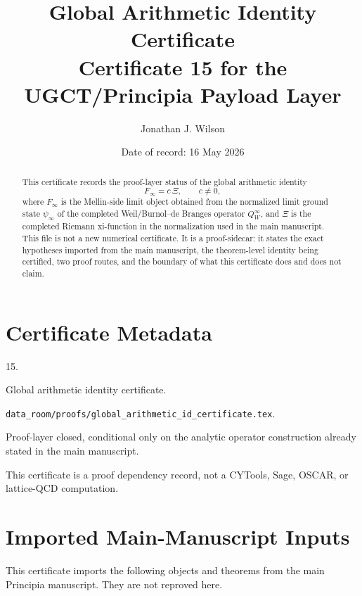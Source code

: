 \documentclass[11pt]{article}
\title{Global Arithmetic Identity Certificate\\
\large Certificate 15 for the UGCT/Principia Payload Layer}
\author{Jonathan J. Wilson}
\date{Date of record: 16 May 2026}
\newcommand{\XiF}{\Xi}
\newcommand{\Finf}{F_{\infty}}
\newcommand{\psiinf}{\psi_{\infty}}
\newcommand{\QWinf}{Q_{W}^{\infty}}
\begin{document}
\maketitle

\begin{abstract}
This certificate records the proof-layer status of the global arithmetic identity
\[
  \Finf = c\,\XiF,
  \qquad c\neq 0,
\]
where $\Finf$ is the Mellin-side limit object obtained from the normalized
limit ground state $\psiinf$ of the completed Weil/Burnol--de Branges operator
$\QWinf$, and $\XiF$ is the completed Riemann xi-function in the normalization
used in the main manuscript.  This file is not a new numerical certificate.  It
is a proof-sidecar: it states the exact hypotheses imported from the main
manuscript, the theorem-level identity being certified, two proof routes, and
the boundary of what this certificate does and does not claim.
\end{abstract}

\section{Certificate Metadata}

\begin{description}[leftmargin=3.0cm,style=nextline]
  \item[Certificate ID] 15.
  \item[Name] Global arithmetic identity certificate.
  \item[Payload file] \texttt{data\_room/proofs/global\_arithmetic\_id\_certificate.tex}.
  \item[Status] Proof-layer closed, conditional only on the analytic operator
  construction already stated in the main manuscript.
  \item[Not a numerical task] This certificate is a proof dependency record,
  not a CYTools, Sage, OSCAR, or lattice-QCD computation.
\end{description}

\section{Imported Main-Manuscript Inputs}

This certificate imports the following objects and theorems from the main
Principia manuscript.  They are not reproved here.
\end{document}
